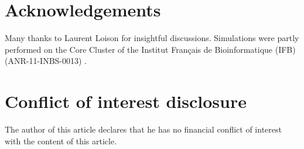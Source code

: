 \documentclass[10pt,a4paper]{article}
\begin{document}
\section*{Acknowledgements}

Many thanks to Laurent Loison for insightful discussions. Simulations were partly performed on the Core Cluster of the Institut Français de Bioinformatique (IFB) (ANR-11-INBS-0013) .

\section*{Conflict of interest disclosure}

The author of this article declares that he has no financial conflict of interest with the content of this article.

\printbibliography

\clearpage
\end{document}
